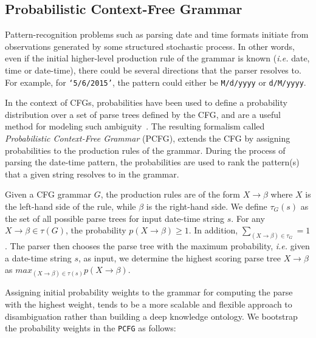 \subsection{Probabilistic Context-Free Grammar}

Pattern-recognition problems such as parsing date and time formats initiate from observations generated by some structured stochastic process. In other words, even if the initial higher-level production rule of the grammar is known (\textit{i.e.} date, time or date-time), there could be several directions that the parser resolves to. For example, for \texttt{`5/6/2015'}, the pattern could either be \texttt{M/d/yyyy} or \texttt{d/M/yyyy}. 

In the context of CFGs, probabilities have been used to define a probability distribution over a set of parse trees defined by the CFG, and are a useful method for modeling such ambiguity~\cite{Collins:2003,Manning:1999}. The resulting formalism called \textit{Probabilistic Context-Free Grammar} (PCFG), extends the CFG by assigning probabilities to the production rules of the grammar. During the process of parsing the date-time pattern, the probabilities are used to rank the pattern(s) that a given string resolves to in the grammar. 


Given a CFG grammar $G$, the production rules are of the form $ X \rightarrow \beta$ where $X$ is the left-hand side of the rule, while $\beta$ is the right-hand side. We define  $\tau_G(s)$ as the set of all possible parse trees for input date-time string $s$.  For any $X \rightarrow \beta \in \tau(G)$, the probability $p(X \rightarrow \beta) \ge 1$. In addition, $\sum_{(X \rightarrow \beta) \in \tau_{G}} = 1$. The parser then chooses the parse tree with the maximum probability, \textit{i.e.} given a date-time string $s$, as input, we determine the highest scoring parse tree $X \rightarrow \beta$ as  $max_{(X \rightarrow \beta) \in \tau(s)} p(X \rightarrow \beta)$.


Assigning initial probability weights to the grammar for computing the parse with the highest weight, tends to be a more scalable and flexible approach to disambiguation rather than building a deep knowledge ontology. We bootstrap the probability weights in the \texttt{PCFG} as follows:

